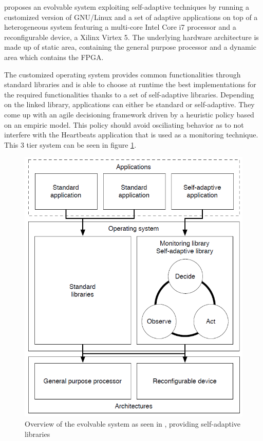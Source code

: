 
\cite{evolvable} proposes an evolvable system exploiting self-adaptive techniques by running a customized version of GNU/Linux and a set of adaptive applications on top of a heterogeneous system featuring a multi-core Intel Core i7 processor and a reconfigurable device, a Xilinx Virtex 5. The underlying hardware architecture is made up of static area, containing the general purpose processor and a dynamic area which contains the FPGA. 

The customized operating system provides common functionalities through standard libraries and is able to choose at runtime the best implementations for the required functionalities thanks to a set of self-adaptive libraries. Depending on the linked library, applications can either be standard or self-adaptive. They come up with an agile decisioning framework driven by a heuristic policy based on an empiric model. This policy should avoid osciliating behavior as to not interfere with the Heartbeats application that is used as a monitoring technique. This 3 tier system can be seen in figure \ref{fig:tier}.
%
\begin{figure}[htb]%
\includegraphics[width=\columnwidth]{Pictures/3tier.png}%
\caption{Overview of the evolvable system as seen in \cite{evolvable}, providing self-adaptive libraries}%
\label{fig:tier}%
\end{figure}

